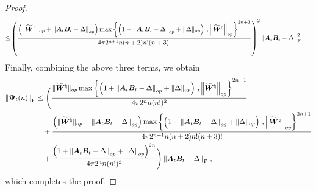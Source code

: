 \begin{proof}
\begin{align*}
    \leq & \left(\frac{\left(\|\widetilde{\bm W}^\natural\|_{op}+\left\|\bm A_{t}\bm B_t - \Delta\right\|_{op}\right)\max\left\{\left(1 + \left\|\bm A_t \bm B_t - \Delta\right\|_{op} + \|\Delta\|_{op}\right)\,,\left\|\widetilde{\bm W}^\natural\right\|_{op}\right\}^{2n+1}}{4\pi2^{n+1} n(n + 2)n!(n+3)!}\right)^2\left\|\bm A_t \bm B_t - \Delta\right\|^2_{\rm F}\,.
\end{align*}
Finally, combining the above three terms, we obtain
\begin{align*}
  \left\|\bm \Psi_t(n)\right\|_{\rm F}
  & \leq \Bigg(\frac{\|\widetilde{\bm W}^\natural\|_{op}\max\left\{\left(1 + \left\|\bm A_t \bm B_t - \Delta\right\|_{op} + \|\Delta\|_{op}\right)\,,\left\|\widetilde{\bm W}^\natural\right\|_{op}\right\}^{2n-1}}{4\pi 2^{n} n (n!)^2}\\
  & \quad +\frac{\left(\|\widetilde{\bm W}^\natural\|_{op}+\left\|\bm A_{t}\bm B_t - \Delta\right\|_{op}\right)\max\left\{\left(1 + \left\|\bm A_t \bm B_t - \Delta\right\|_{op} + \|\Delta\|_{op}\right)\,,\left\|\widetilde{\bm W}^\natural\right\|_{op}\right\}^{2n+1}}{4\pi2^{n+1} n(n + 2)n!(n+3)!}\\
  & \quad +\frac{\left(1+\left\|\bm A_{t}\bm B_t - \Delta\right\|_{op}+\left\|\Delta\right\|_{op}\right)^{2n}}{4\pi 2^{n} n (n!)^2}\Bigg)\left\|\bm A_t \bm B_t - \Delta\right\|_{\rm F}\,,
\end{align*}
which completes the proof.
\end{proof}

